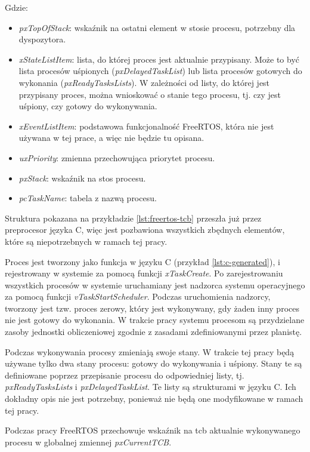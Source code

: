 \documentclass[../../main]{subfiles}
\begin{document}
Gdzie:

\begin{itemize}
    \item \textit{pxTopOfStack}: wskaźnik na ostatni element w stosie procesu, potrzebny dla dyspozytora.
    \item \textit{xStateListItem}: lista, do której proces jest aktualnie przypisany. Może to być lista procesów uśpionych (\textit{pxDelayedTaskList}) lub lista procesów gotowych do wykonania (\textit{pxReadyTasksLists}). W zależności od listy, do której jest przypisany proces, można wnioskować o stanie tego procesu, tj. czy jest uśpiony, czy gotowy do wykonywania.
    \item \textit{xEventListItem}: podstawowa funkcjonalność FreeRTOS, która nie jest używana w tej prace, a więc nie będzie tu opisana.
    \item \textit{uxPriority}: zmienna przechowująca priorytet procesu.
    \item \textit{pxStack}: wskaźnik na stos procesu.
    \item \textit{pcTaskName}: tabela z nazwą procesu. 
\end{itemize}

Struktura pokazana na przykładzie \ref{lst:freertos-tcb} przeszła już przez preprocesor języka C, więc jest pozbawiona wszystkich zbędnych elementów, które są niepotrzebnych w ramach tej pracy.

Proces jest tworzony jako funkcja w języku C (przykład \ref{lst:c-generated}), i rejestrowany w systemie za pomocą funkcji \textit{xTaskCreate}. Po zarejestrowaniu wszystkich procesów w systemie uruchamiany jest nadzorca systemu operacyjnego za pomocą funkcji \textit{vTaskStartScheduler}. Podczas uruchomienia nadzorcy, tworzony jest tzw. proces zerowy, który jest wykonywany, gdy żaden inny proces nie jest gotowy do wykonania. W trakcie pracy systemu procesom są przydzielane zasoby jednostki obliczeniowej zgodnie z zasadami zdefiniowanymi przez planistę.

Podczas wykonywania procesy zmieniają swoje stany. W trakcie tej pracy będą używane tylko dwa stany procesu: gotowy do wykonywania i uśpiony. Stany te są definiowane poprzez przepisanie procesu do odpowiedniej listy, tj. \textit{pxReadyTasksLists} i \textit{pxDelayedTaskList}. Te listy są strukturami w języku C. Ich dokładny opis nie jest potrzebny, ponieważ nie będą one modyfikowane w ramach tej pracy.

Podczas pracy FreeRTOS przechowuje wskaźnik na \gls{tcb} aktualnie wykonywanego procesu w globalnej zmiennej \textit{pxCurrentTCB}.
\end{document}
